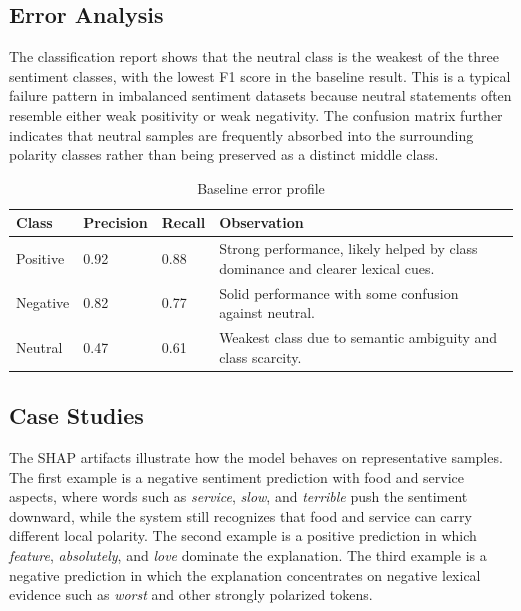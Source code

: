 \documentclass[12pt, a4paper]{article}
\begin{document}
\subsection{Error Analysis}
The classification report shows that the neutral class is the weakest of the three sentiment classes, with the lowest F1 score in the baseline result. This is a typical failure pattern in imbalanced sentiment datasets because neutral statements often resemble either weak positivity or weak negativity. The confusion matrix further indicates that neutral samples are frequently absorbed into the surrounding polarity classes rather than being preserved as a distinct middle class.

\begin{table}[H]
\centering
\caption{Baseline error profile}
\begin{tabularx}{\textwidth}{@{} p{2.5cm} p{2cm} p{2cm} X @{}}
\toprule
\textbf{Class} & \textbf{Precision} & \textbf{Recall} & \textbf{Observation} \\
\midrule
Positive & 0.92 & 0.88 & Strong performance, likely helped by class dominance and clearer lexical cues. \\
Negative & 0.82 & 0.77 & Solid performance with some confusion against neutral. \\
Neutral & 0.47 & 0.61 & Weakest class due to semantic ambiguity and class scarcity. \\
\bottomrule
\end{tabularx}
\end{table}

\subsection{Case Studies}
The SHAP artifacts illustrate how the model behaves on representative samples. The first example is a negative sentiment prediction with food and service aspects, where words such as \textit{service}, \textit{slow}, and \textit{terrible} push the sentiment downward, while the system still recognizes that food and service can carry different local polarity. The second example is a positive prediction in which \textit{feature}, \textit{absolutely}, and \textit{love} dominate the explanation. The third example is a negative prediction in which the explanation concentrates on negative lexical evidence such as \textit{worst} and other strongly polarized tokens.
\end{document}
